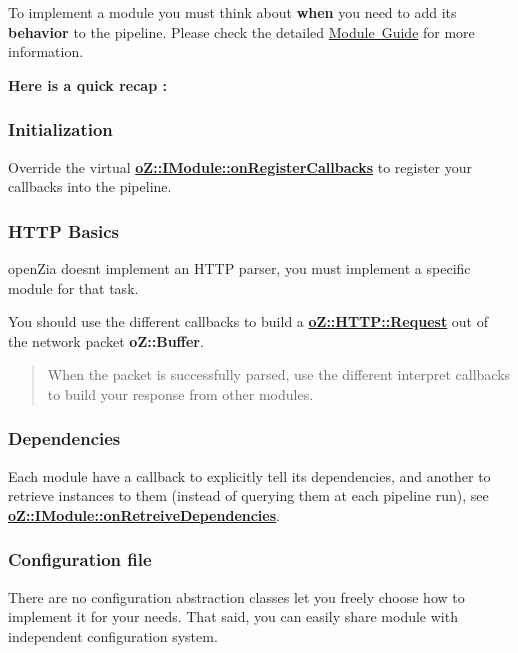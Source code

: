 To implement a module you must think about {\bfseries{when}} you need to add its {\bfseries{behavior}} to the pipeline. Please check the detailed \mbox{\hyperlink{md__m_o_d_u_l_e}{Module Guide}} for more information.

{\bfseries{Here is a quick recap \+:}}

\subsubsection*{Initialization}

Override the virtual {\bfseries{\mbox{\hyperlink{classo_z_1_1_i_module_a3dc905faa6df5e22eecc6ffbc923fd95}{o\+Z\+::\+I\+Module\+::on\+Register\+Callbacks}}}} to register your callbacks into the pipeline.

\subsubsection*{H\+T\+TP Basics}

open\+Zia doesn\textquotesingle{}t implement an H\+T\+TP parser, you must implement a specific module for that task.

You should use the different callbacks to build a {\bfseries{\mbox{\hyperlink{classo_z_1_1_h_t_t_p_1_1_request}{o\+Z\+::\+H\+T\+T\+P\+::\+Request}}}} out of the network packet {\bfseries{o\+Z\+::\+Buffer}}.

\begin{quote}
When the packet is successfully parsed, use the different interpret callbacks to build your response from other modules. \end{quote}


\subsubsection*{Dependencies}

Each module have a callback to explicitly tell its dependencies, and another to retrieve instances to them (instead of querying them at each pipeline run), see {\bfseries{\mbox{\hyperlink{classo_z_1_1_i_module_af183d3711ef7d7a6966ac078b63a7685}{o\+Z\+::\+I\+Module\+::on\+Retreive\+Dependencies}}}}.

\subsubsection*{Configuration file}

There are no configuration abstraction classes let you freely choose how to implement it for your needs. That said, you can easily share module with independent configuration system.

